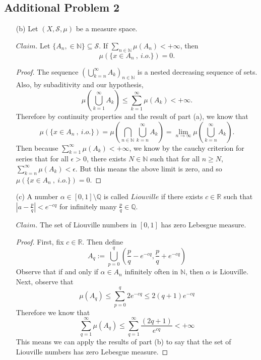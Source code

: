 \documentclass[12pt]{article}
\def\R{\mathbb{R}}
\def\N{\mathbb{N}}
\def\Q{\mathbb{Q}}
\begin{document}
\subsection*{Additional Problem 2}

\begin{itemize}
    \item[(b)] Let $(X, \mathcal{S}, \mu)$ be a measure space.
    
    $Claim.$ Let $\{ A_n, \in \N \} \subseteq \mathcal{S}$. If $ \sum_{n \in \N} \mu(A_n) < +\infty$, then $$\mu (\{ x \in A_n~,~ i.o.\}) = 0.$$

    \begin{proof}
        The sequence $\left(\bigcup_{k = n}^\infty A_k\right)_{n\in\N}$ is a nested decreasing sequence of sets. Also, by subaditivity and our hypothesis, $$\mu\left(\bigcup_{k = 1}^\infty A_k\right) \leq \sum_{k=1}^\infty \mu(A_k) < +\infty.$$ Therefore by continuity properties and the result of part (a), we know that $$ \mu (\{ x \in A_n~,~ i.o.\}) = \mu\left(\bigcap_{n\in\N} \bigcup_{k=n}^\infty A_k \right) = \lim_{n\to\infty} \mu \left( \bigcup_{k=n}^\infty A_k\right).$$ Then because $\sum_{k=1}^\infty \mu(A_k) < +\infty$, we know by the cauchy criterion for series that for all $\epsilon > 0$, there exists $N \in \N$ such that for all $n \geq N$, $\sum_{k=n}^\infty \mu(A_k) < \epsilon$. But this means the above limit is zero, and so $\mu (\{ x \in A_n~,~ i.o.\}) = 0$.
    \end{proof}

    \item[(c)] A number $\alpha \in [0,1] \setminus \Q$ is called $Liouville$ if there exists $c \in \R$ such that $|a - \frac{p}{q}| < e^{-cq}$ for infinitely many $\frac{p}{q} \in \Q$.

    $Claim.$ The set of Liouville numbers in $[0,1]$ has zero Lebesgue measure.

    \begin{proof}
        First, fix $c \in \R$. Then define $$A_q := \bigcup_{p=0}^q \left(\frac{p}{q} - e^{-cq}, \frac{p}{q} + e^{-cq} \right)$$ Observe that if and only if $\alpha \in A_n$ infinitely often in $\N$, then $\alpha$ is Liouville. Next, observe that $$\mu(A_q) \leq \sum_{p=0}^q 2e^{-cq} \leq 2(q+1)e^{-cq}$$ Therefore we know that $$\sum_{q=1}^\infty \mu(A_q) \leq \sum_{q=1}^{\infty} \frac{(2q+1)}{e^{cq}} < +\infty$$ This means we can apply the results of part (b) to say that the set of Liouville numbers has zero Lebesgue measure. 
    \end{proof}
\end{itemize}
\end{document}
